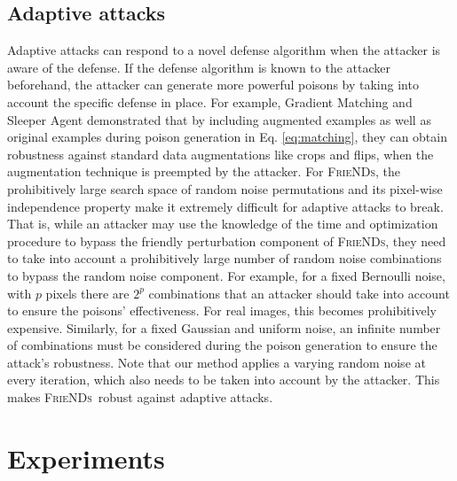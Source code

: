 \documentclass{article}
\newcommand{\alg}{\textsc{FrieNDs}}
\begin{document}
\subsection{Adaptive attacks}
\label{sec:adaptive-attacks}
Adaptive attacks can respond to a novel defense algorithm when the attacker is aware of the defense. 
If the defense algorithm is known to the attacker beforehand, the attacker can generate more powerful poisons by taking into account the specific defense in place. For example, Gradient Matching \cite{geiping2020witches} and Sleeper Agent \cite{souri2021sleeper} demonstrated that by including augmented examples as well as original examples during poison generation in Eq. \eqref{eq:matching}, they can obtain
robustness against standard data augmentations like crops and flips, when the augmentation technique is preempted by the attacker. 
For \alg, the prohibitively large search space of random noise permutations and its pixel-wise independence property make it extremely difficult for adaptive attacks to break. 
That is, while an attacker may use the knowledge of the time and optimization procedure to bypass the friendly perturbation component of \alg, they need to take into account a prohibitively large number of random noise combinations to bypass the random noise component. 
For example, for a fixed Bernoulli noise, with $p$ pixels there are $2^p$ combinations that an attacker should take into account to ensure the poisons' effectiveness. For real images, this becomes prohibitively expensive. Similarly, for a fixed Gaussian and uniform noise, an infinite number of combinations must be considered during the poison generation to ensure the attack's robustness. Note that our method applies a varying random noise at every iteration, which also needs to be taken into account by the attacker.
This makes \alg~robust against adaptive attacks. %





















\section{Experiments}
\end{document}
